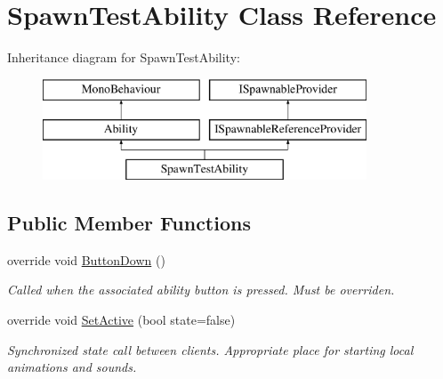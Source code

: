 \hypertarget{class_spawn_test_ability}{}\section{Spawn\+Test\+Ability Class Reference}
\label{class_spawn_test_ability}
Inheritance diagram for Spawn\+Test\+Ability\+:\begin{figure}[H]
\begin{center}
\leavevmode
\includegraphics[height=3.000000cm]{class_spawn_test_ability}
\end{center}
\end{figure}
\subsection*{Public Member Functions}
\begin{DoxyCompactItemize}
\item 
override void \hyperlink{class_spawn_test_ability_ab6b09e46c9915a7980ac533a7162ea48}{Button\+Down} ()
\begin{DoxyCompactList}\small\item\em Called when the associated ability button is pressed. Must be overriden. \end{DoxyCompactList}\item 
override void \hyperlink{class_spawn_test_ability_a238beca9f6296b80e950525108b97193}{Set\+Active} (bool state=false)
\begin{DoxyCompactList}\small\item\em Synchronized state call between clients. Appropriate place for starting local animations and sounds. \end{DoxyCompactList}\end{DoxyCompactItemize}
